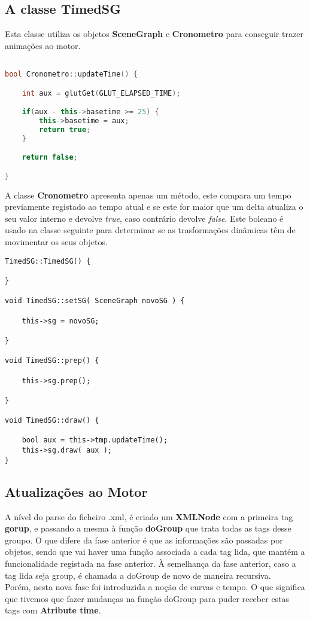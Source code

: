 \documentclass{article}
\begin{document}
\subsection{A classe TimedSG} 

Esta classe utiliza os objetos \textbf{SceneGraph} e \textbf{Cronometro} para conseguir trazer animações ao motor.

\begin{file}
        \begin{lstlisting}[language=C++]

bool Cronometro::updateTime() {

    int aux = glutGet(GLUT_ELAPSED_TIME);

    if(aux - this->basetime >= 25) {
        this->basetime = aux;
        return true;
    }

    return false;

}
	\end{lstlisting}
\end{file}

A classe \textbf{Cronometro} apresenta apenas um método, este compara um tempo previamente registado ao tempo atual e se este for maior que um delta atualiza o seu valor interno e devolve \textit{true}, caso contrário devolve \textit{false}. 
Este boleano é usado na classe seguinte para determinar se as trasformações dinâmicas têm de movimentar os seus objetos.

\begin{file}
	\begin{lstlisting}
TimedSG::TimedSG() {

}

void TimedSG::setSG( SceneGraph novoSG ) {

    this->sg = novoSG;

}

void TimedSG::prep() {

    this->sg.prep();

}

void TimedSG::draw() {

    bool aux = this->tmp.updateTime();
    this->sg.draw( aux );
}
	\end{lstlisting}
\end{file}

\subsection{Atualizações ao Motor}

A nível do parse do ficheiro .xml, é criado um \textbf{XMLNode} com a primeira tag \textbf{gorup}, e passando a mesma à função \textbf{doGroup} que trata todas as tags desse groupo. O que difere da fase anterior é que as informações são passadas por objetos, sendo que vai haver uma função associada a cada tag lida, que mantém a funcionalidade registada na fase anterior. À semelhança da fase anterior, caso a tag lida seja group, é chamada a doGroup de novo de maneira recursiva.\\
Porém, nesta nova fase foi introduzida a noção de curvas e tempo. O que significa que tivemos que fazer mudanças na função doGroup para puder receber estas tags com \textbf{Atribute time}.\\
\end{document}
